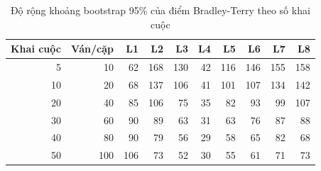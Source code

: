 \begin{table}[H]
  \centering
  \footnotesize
  \caption{Độ rộng khoảng bootstrap 95\% của điểm Bradley-Terry theo số khai cuộc}
  \label{tab:cs-tk-hoitu}
  \begin{tabular}{rrrrrrrrrr}
    \toprule
    Khai cuộc & Ván/cặp & L1 & L2 & L3 & L4 & L5 & L6 & L7 & L8 \\
    \midrule
    5 & 10 & 62 & 168 & 130 & 42 & 116 & 146 & 155 & 158 \\
    10 & 20 & 68 & 137 & 106 & 41 & 101 & 107 & 134 & 142 \\
    20 & 40 & 85 & 106 & 75 & 35 & 82 & 93 & 99 & 107 \\
    30 & 60 & 90 & 89 & 63 & 31 & 63 & 76 & 87 & 88 \\
    40 & 80 & 90 & 79 & 56 & 29 & 58 & 65 & 82 & 68 \\
    50 & 100 & 106 & 73 & 52 & 30 & 55 & 61 & 71 & 73 \\
    \bottomrule
  \end{tabular}
\end{table}
